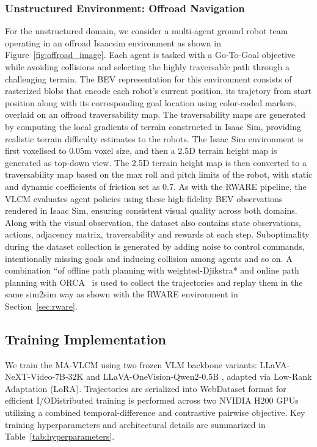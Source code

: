 \documentclass[letterpaper, 10 pt, conference]{ieeeconf}  %
\begin{document}
\subsubsection{Unstructured Environment: Offroad Navigation}
For the unstructured domain, we consider a multi-agent ground robot team operating in an offroad Isaacsim environment as shown in Figure~\ref{fig:offroad_image}. Each agent is tasked with a Go-To-Goal objective  while avoiding collisions and selecting the highly traversable path through a challenging terrain. The BEV representation for this environment consists of rasterized blobs that encode each robot's current position, its trajctory from start position along with  its corresponding goal location using color-coded markers, overlaid on an offroad traversability map. The traversability maps are generated by computing the  local gradients of  terrain constructed in Isaac Sim, providing realistic terrain difficulty estimates to the robots. The Isaac Sim environment is first voxelised to 0.05m voxel size, and then a 2.5D terrain height map is generated as top-down view. The 2.5D terrain height map is then converted to a traversability map based on the max roll and pitch limits of the robot, with static and dynamic coefficients of friction set as 0.7. As with the RWARE pipeline, the VLCM evaluates agent policies using these high-fidelity BEV observations rendered in Isaac Sim, ensuring consistent visual quality across both domains. Along with the visual observation, the dataset also contains state observations, actions, adjacency matrix, traversability  and  rewards at each step. Suboptimality during the dataset collection is generated by adding noise to control commands, intentionally missing goals and inducing collision among agents and so on. 
A combination ``of offline path planning with weighted-Djikstra* and online path planning with ORCA~\cite{berg2011reciprocal} is used to collect the trajectories and replay them in the same sim2sim way as shown with the RWARE environment in Section~\ref{sec:rware}.

\subsection{Training Implementation}
\label{subsec:training_impl}
We train the MA-VLCM using two frozen VLM backbone variants: LLaVA-NeXT-Video-7B-32K and LLaVA-OneVision-Qwen2-0.5B , adapted via Low-Rank Adaptation (LoRA). Trajectories are serialized into WebDataset format for efficient I/ODistributed training is performed across two NVIDIA H200 GPUs utilizing a combined temporal-difference and contrastive pairwise objective. Key training hyperparameters and architectural details are summarized in Table~\ref{tab:hyperparameters}.
\end{document}
